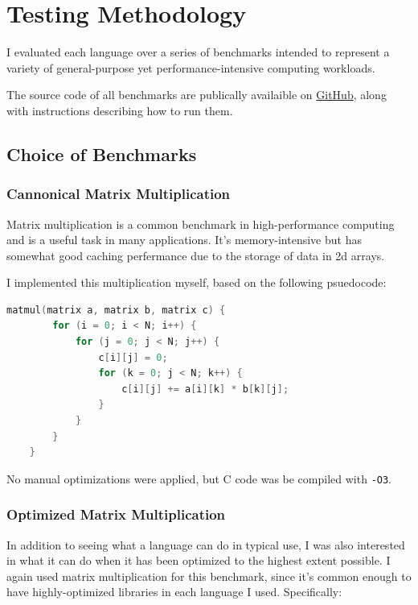 \documentclass[12pt,letterpaper]{article}
\begin{document}
\clearpage

\tableofcontents

\clearpage

\section{Testing Methodology}

I evaluated each language over a series of benchmarks intended to represent a
variety of general-purpose yet performance-intensive computing workloads.

The source code of all benchmarks are publically availaible on
\href{https://github.com/JasonSauntry/performance-of-programming-languages}{GitHub},
along with instructions describing how to run them.



\subsection{Choice of Benchmarks}

\subsubsection{Cannonical Matrix Multiplication}

Matrix multiplication is a common benchmark in high-performance computing and is
a useful task in many applications. It's memory-intensive but has somewhat good
caching perfermance due to the storage of data in 2d arrays.

I implemented this multiplication myself, based on the following psuedocode:

\begin{lstlisting}[language=c]
	matmul(matrix a, matrix b, matrix c) {
		for (i = 0; i < N; i++) {
			for (j = 0; j < N; j++) {
				c[i][j] = 0;
				for (k = 0; j < N; k++) {
					c[i][j] += a[i][k] * b[k][j];
				}
			}
		}
	}
\end{lstlisting}

No manual optimizations were applied, but C code was be compiled with
\texttt{-O3}.

\subsubsection{Optimized Matrix Multiplication}

In addition to seeing what a language can do in typical use, I was also
interested in what it can do when it has been optimized to the highest extent
possible. I again used matrix multiplication for this benchmark, since it's
common enough to have highly-optimized libraries in each language I used.
Specifically:
\end{document}
